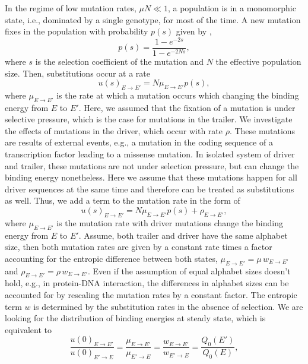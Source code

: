 \documentclass[10pt,a4paper]{article}
\begin{document}
\noindent In the regime of low mutation rates, $\mu N\ll1$, a population is in a monomorphic state, i.e., dominated by a single genotype, 
for most of the time. A new mutation fixes in the population with probability $p(s)$ given by \cite{kimura1962probability},
\begin{equation}
p(s) = \frac{1-e^{-2s}}{1-e^{-2Ns}},
\end{equation}
where $s$ is the selection coefficient of the mutation and $N$ the effective population size. Then, substitutions occur at a rate
\begin{equation}
u(s)_{E\rightarrow E'} = N\mu_{E\rightarrow E'}p(s),
\end{equation}
where $\mu_{E\rightarrow E'}$ is the rate at which a mutation occurs which changing the binding energy from $E$ to $E'$. Here, we assumed that the fixation 
of a mutation is under selective pressure, which is the case for mutations in the trailer. We investigate the effects of mutations in the driver, which occur 
with rate $\rho$. These mutations are results of external events, e.g., a mutation in the coding sequence of a transcription factor leading to a missense mutation. 
In isolated system of driver and trailer, these mutations are not under selection pressure, but can change the binding energy nonetheless. 
Here we assume that these mutations happen for all driver sequences at the same time and therefore can be treated as substitutions as well. 
Thus, we add a term to the mutation rate in the form of
\begin{equation}
u(s)_{E\rightarrow E'}=   N\mu_{E\rightarrow E'}p(s) + \rho_{E\rightarrow E'},
\end{equation}
where $\mu_{E\rightarrow E'}$ is the mutation rate with driver mutations change the binding energy from $E$ to $E'$.
Assume, both trailer and driver have the same alphabet size, then both mutation rates are given by a constant rate times a factor accounting for 
the entropic difference between both states, $\mu_{E\rightarrow E'}=\mu\,w_{E\rightarrow E'}$ and $\rho_{E\rightarrow E'}=\rho\,w_{E\rightarrow E'}$. 
Even if the assumption of equal alphabet sizes doesn't hold, e.g., in protein-DNA interaction, the differences in alphabet sizes can be accounted for 
by rescaling the mutation rates by a constant factor. The entropic term $w$ is determined by the substitution rates in the absence of selection.
We are looking for the distribution of binding energies at steady state, which is equivalent to 
\begin{equation}
\frac{u(0)_{E\rightarrow E'}}{u(0)_{E'\rightarrow E}} = \frac{\mu_{E\rightarrow E'}}{\mu_{E'\rightarrow E}}= \frac{w_{E\rightarrow E'}}{w_{E'\rightarrow E}} = 
\frac{Q_0(E')}{Q_0(E)},
\end{equation}
\end{document}
